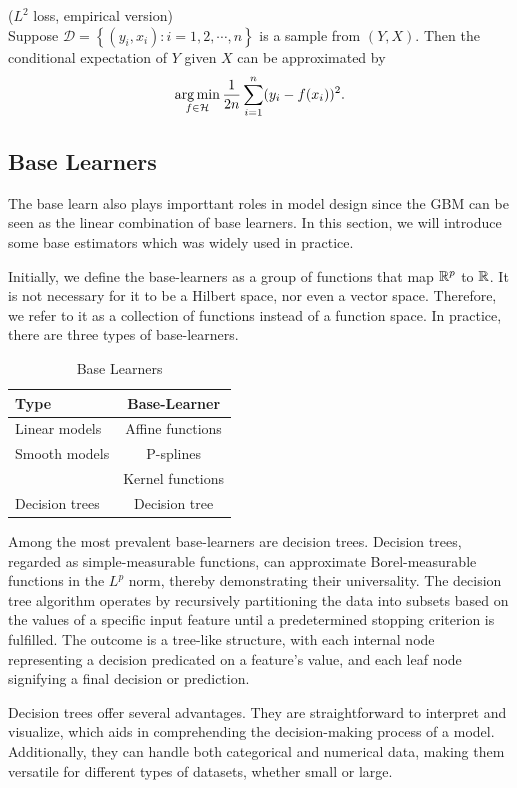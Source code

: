 \begin{Theorem}{($L^2$ loss, empirical version)} \ \\
Suppose $\mathcal{D}=\left\{ (y_i,x_i): i=1,2,\cdots,n \right\}$ is a sample from $(Y,X)$. Then the conditional expectation of $Y$ given $X$ can be approximated by 
$$
\mathop{\arg\min}_{f \in \mathcal{H}} \frac{1}{2n} \sum_{i=1}^n (y_i - f(x_i))^2.
$$
\end{Theorem}

\subsection{Base Learners}
The base learn  also plays importtant roles in model design since the GBM can be seen as the linear combination of base learners. In this section, we will introduce some base estimators which was widely used in practice.

Initially, we define the base-learners as a group of functions that map $\mathbb{R}^p$ to $\mathbb{R}$. It is not necessary for it to be a Hilbert space, nor even a vector space. Therefore, we refer to it as a collection of functions instead of a function space. In practice, there are three types of base-learners.
\begin{table}[htb]
\centering
\begin{tabular}{lc}
\toprule
\textbf{Type} & \textbf{Base-Learner}  \\
\midrule
Linear models& Affine functions  \\
Smooth models & P-splines  \\
 & Kernel functions  \\
Decision trees & Decision tree  \\
\bottomrule
\end{tabular}
\caption{Base Learners}
\label{tab:base-learners}
\end{table}

Among the most prevalent base-learners are decision trees. Decision trees, regarded as simple-measurable functions, can approximate Borel-measurable functions in the $L^p$ norm, thereby demonstrating their universality. The decision tree algorithm operates by recursively partitioning the data into subsets based on the values of a specific input feature until a predetermined stopping criterion is fulfilled. The outcome is a tree-like structure, with each internal node representing a decision predicated on a feature's value, and each leaf node signifying a final decision or prediction.

Decision trees offer several advantages. They are straightforward to interpret and visualize, which aids in comprehending the decision-making process of a model. Additionally, they can handle both categorical and numerical data, making them versatile for different types of datasets, whether small or large.



